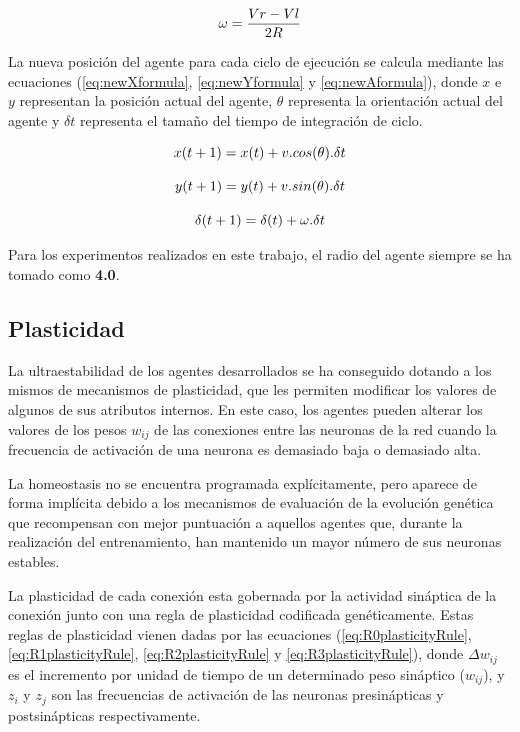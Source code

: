 \begin{equation} \label{eq:WFormula}
 \centering
 \omega = \frac{Vr - Vl}{2R}
\end{equation}

La nueva posición del agente para cada ciclo de ejecución se calcula mediante las ecuaciones (\ref{eq:newXformula}, \ref{eq:newYformula} y \ref{eq:newAformula}), donde $x$ e $y$ representan la posición actual del agente,
$\theta$ representa la orientación actual del agente y $\delta t$ representa el tamaño del tiempo de integración de ciclo.

\begin{equation} \label{eq:newXformula}
 \centering
 x(t + 1) = x(t) + v.cos(\theta).\delta t
\end{equation}

\begin{equation} \label{eq:newYformula}
 \centering
 y(t + 1) = y(t) + v.sin(\theta).\delta t
\end{equation}

\begin{equation} \label{eq:newAformula}
 \centering
 \delta (t + 1) = \delta (t) + \omega .\delta t
\end{equation}

Para los experimentos realizados en este trabajo, el radio del agente siempre se ha tomado como \textbf{4.0}.

\subsection{Plasticidad}
La ultraestabilidad de los agentes desarrollados se ha conseguido dotando a los mismos de mecanismos de plasticidad, que les permiten modificar los valores de algunos de sus atributos internos. En este caso, los agentes pueden
alterar los valores de los pesos $w_{ij}$ de las conexiones entre las neuronas de la red cuando la frecuencia de activación de una neurona es demasiado baja o demasiado alta.

La homeostasis no se encuentra programada explícitamente, pero aparece de forma implícita debido a los mecanismos de evaluación de la evolución genética que recompensan con mejor puntuación a aquellos
agentes que, durante la realización del entrenamiento, han mantenido un mayor número de sus neuronas estables.

La plasticidad de cada conexión esta gobernada por la actividad sináptica de la conexión junto con una regla de plasticidad codificada genéticamente. Estas reglas de plasticidad vienen dadas por las
ecuaciones (\ref{eq:R0plasticityRule}, \ref{eq:R1plasticityRule}, \ref{eq:R2plasticityRule} y \ref{eq:R3plasticityRule}), donde $\Delta w_{ij}$ es el incremento por unidad de tiempo de un determinado peso sináptico ($w_{ij}$), y $z_{i}$ y $z_{j}$ son las frecuencias de
activación de las neuronas presinápticas y postsinápticas respectivamente.

